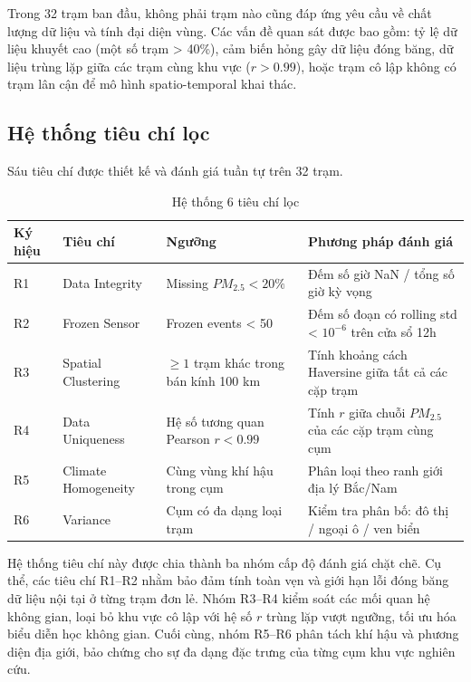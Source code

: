 Trong 32 trạm ban đầu, không phải trạm nào cũng đáp ứng yêu cầu về chất lượng dữ liệu và tính đại diện vùng. Các vấn đề quan sát được bao gồm: tỷ lệ dữ liệu khuyết cao (một số trạm > 40\%), cảm biến hỏng gây dữ liệu đóng băng, dữ liệu trùng lặp giữa các trạm cùng khu vực ($r > 0.99$), hoặc trạm cô lập không có trạm lân cận để mô hình spatio-temporal khai thác.

\subsection{Hệ thống tiêu chí lọc}

Sáu tiêu chí được thiết kế và đánh giá tuần tự trên 32 trạm.

\begin{table}[H]
    \centering
    \caption{Hệ thống 6 tiêu chí lọc}
    \label{tab:he_thong_tieu_chi}
    \renewcommand{\arraystretch}{1.3}
    \begin{tabular}{p{1.5cm} p{3cm} p{4.5cm} p{5cm}}
    \toprule
    \textbf{Ký hiệu} & \textbf{Tiêu chí} & \textbf{Ngưỡng} & \textbf{Phương pháp đánh giá} \\
    \midrule
    R1 & Data Integrity & Missing $PM_{2.5} < 20\%$ & Đếm số giờ NaN / tổng số giờ kỳ vọng \\
    R2 & Frozen Sensor & Frozen events < 50 & Đếm số đoạn có rolling std < $10^{-6}$ trên cửa sổ 12h \\
    R3 & Spatial Clustering & $\ge 1$ trạm khác trong bán kính 100 km & Tính khoảng cách Haversine giữa tất cả các cặp trạm \\
    R4 & Data Uniqueness & Hệ số tương quan Pearson $r < 0.99$ & Tính $r$ giữa chuỗi $PM_{2.5}$ của các cặp trạm cùng cụm \\
    R5 & Climate Homogeneity & Cùng vùng khí hậu trong cụm & Phân loại theo ranh giới địa lý Bắc/Nam \\
    R6 & Variance & Cụm có đa dạng loại trạm & Kiểm tra phân bố: đô thị / ngoại ô / ven biển \\
    \bottomrule
    \end{tabular}
\end{table}


Hệ thống tiêu chí này được chia thành ba nhóm cấp độ đánh giá chặt chẽ. Cụ thể, các tiêu chí R1--R2 nhằm bảo đảm tính toàn vẹn và giới hạn lỗi đóng băng dữ liệu nội tại ở từng trạm đơn lẻ. Nhóm R3--R4 kiểm soát các mối quan hệ không gian, loại bỏ khu vực cô lập với hệ số $r$ trùng lặp vượt ngưỡng, tối ưu hóa biểu diễn học không gian. Cuối cùng, nhóm R5--R6 phân tách khí hậu và phương diện địa giới, bảo chứng cho sự đa dạng đặc trưng của từng cụm khu vực nghiên cứu.


